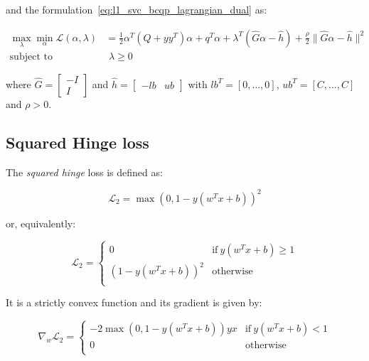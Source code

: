and the formulation~\ref{eq:l1_svc_bcqp_lagrangian_dual} as:

\begin{equation} \label{eq:l1_svc_bcqp_aug_lagrangian_dual}
	\begin{aligned}
    	\max_{\lambda} \min_{\alpha} \mathcal{L}(\alpha,\lambda) &= \frac{1}{2} \alpha^T (Q + yy^T) \alpha + q^T \alpha + \lambda^T (\hat{G} \alpha - \hat{h}) + \frac{\rho}{2} \| \hat{G} \alpha - \hat{h} \|^2 \\
    \text{subject to} \quad & \,\, \lambda \geq 0
	\end{aligned}
\end{equation}

where $\hat{G} =
\begin{bmatrix}
-I \\
 I 
\end{bmatrix}$ and $\hat{h} =
\begin{bmatrix}
-lb & ub
\end{bmatrix}$ with $lb^T = [0, \dots, 0]$, $ub^T = [C, \dots, C]$ and $\rho > 0$.

\pagebreak

\subsection{Squared Hinge loss}

The \emph{squared hinge} loss is defined as:

\begin{equation} \label{eq:squared_hinge_loss2}
	\mathcal{L}_2 = \max(0, 1 - y (w^T x + b))^2
\end{equation}

or, equivalently:

\begin{equation} \label{eq:squared_hinge_loss1}
	\mathcal{L}_2 = 
	\begin{cases}
		0 & \text{if} \ y (w^T x + b) \geq 1 \\
		(1 - y (w^T x + b))^2 & \text{otherwise} \\
	\end{cases}
\end{equation}

It is a strictly convex function and its gradient is given by:

\begin{equation} \label{eq:squared_hinge_loss_der}
    \nabla_w \mathcal{L}_2=
        \begin{cases}
            - 2 \max(0, 1 - y (w^T x + b)) y x & \text{if} \ y (w^T x + b) < 1 \\
            0 & \text{otherwise} \\ 
        \end{cases}
\end{equation}

